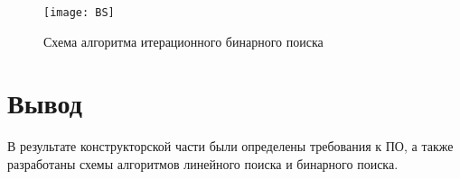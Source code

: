 \begin{figure}[h]
	\centering
	\texttt{[image: BS]}
	\caption{Схема алгоритма итерационного бинарного поиска}
	\label{fig:BS}
\end{figure}

\clearpage

\section{Вывод}

В результате конструкторской части были определены требования к ПО, а также разработаны схемы алгоритмов линейного поиска и бинарного поиска.

\clearpage
